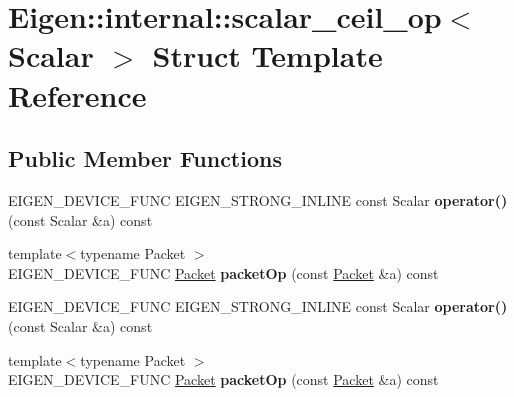 \hypertarget{struct_eigen_1_1internal_1_1scalar__ceil__op}{}\section{Eigen\+:\+:internal\+:\+:scalar\+\_\+ceil\+\_\+op$<$ Scalar $>$ Struct Template Reference}
\label{struct_eigen_1_1internal_1_1scalar__ceil__op}
\subsection*{Public Member Functions}
\begin{DoxyCompactItemize}
\item 
\mbox{\label{struct_eigen_1_1internal_1_1scalar__ceil__op_aecc581d9ed66e5c93a9d00d7f14ea4fe}} 
E\+I\+G\+E\+N\+\_\+\+D\+E\+V\+I\+C\+E\+\_\+\+F\+U\+NC E\+I\+G\+E\+N\+\_\+\+S\+T\+R\+O\+N\+G\+\_\+\+I\+N\+L\+I\+NE const Scalar {\bfseries operator()} (const Scalar \&a) const
\item 
\mbox{\label{struct_eigen_1_1internal_1_1scalar__ceil__op_a7f40ce852d03a7ccc0fa510093af208c}} 
{\footnotesize template$<$typename Packet $>$ }\\E\+I\+G\+E\+N\+\_\+\+D\+E\+V\+I\+C\+E\+\_\+\+F\+U\+NC \hyperlink{union_eigen_1_1internal_1_1_packet}{Packet} {\bfseries packet\+Op} (const \hyperlink{union_eigen_1_1internal_1_1_packet}{Packet} \&a) const
\item 
\mbox{\label{struct_eigen_1_1internal_1_1scalar__ceil__op_aecc581d9ed66e5c93a9d00d7f14ea4fe}} 
E\+I\+G\+E\+N\+\_\+\+D\+E\+V\+I\+C\+E\+\_\+\+F\+U\+NC E\+I\+G\+E\+N\+\_\+\+S\+T\+R\+O\+N\+G\+\_\+\+I\+N\+L\+I\+NE const Scalar {\bfseries operator()} (const Scalar \&a) const
\item 
\mbox{\label{struct_eigen_1_1internal_1_1scalar__ceil__op_a7f40ce852d03a7ccc0fa510093af208c}} 
{\footnotesize template$<$typename Packet $>$ }\\E\+I\+G\+E\+N\+\_\+\+D\+E\+V\+I\+C\+E\+\_\+\+F\+U\+NC \hyperlink{union_eigen_1_1internal_1_1_packet}{Packet} {\bfseries packet\+Op} (const \hyperlink{union_eigen_1_1internal_1_1_packet}{Packet} \&a) const
\end{DoxyCompactItemize}


